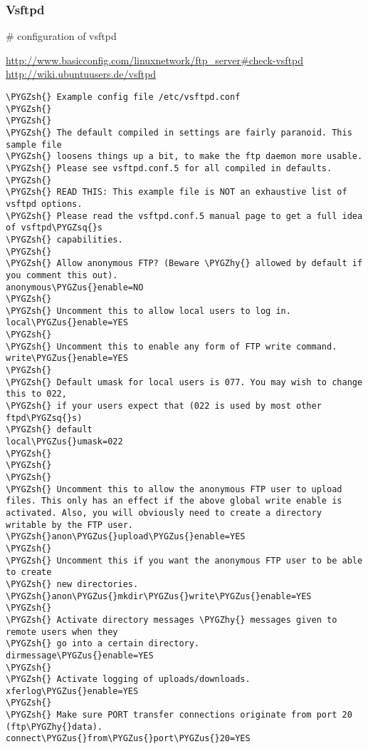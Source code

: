 \documentclass[letterpaper,10pt,english]{sphinxmanual}
\def\PYGZus{\char`\_}
\def\PYGZsh{\char`\#}
\def\PYGZhy{\char`\-}
\def\PYGZsq{\char`\'}
\begin{document}
\subsubsection{Vsftpd}
\label{sdocs/ftpserver/vsftpd/vsftpd:vsftpd}\label{sdocs/ftpserver/vsftpd/vsftpd::doc}
\# configuration of vsftpd

\href{http://www.basicconfig.com/linuxnetwork/ftp\_server\#check-vsftpd}{http://www.basicconfig.com/linuxnetwork/ftp\_server\#check-vsftpd}
\href{http://wiki.ubuntuusers.de/vsftpd}{http://wiki.ubuntuusers.de/vsftpd}

\begin{Verbatim}[commandchars=\\\{\}]
\PYGZsh{} Example config file /etc/vsftpd.conf
\PYGZsh{}
\PYGZsh{}
\PYGZsh{} The default compiled in settings are fairly paranoid. This sample file
\PYGZsh{} loosens things up a bit, to make the ftp daemon more usable.
\PYGZsh{} Please see vsftpd.conf.5 for all compiled in defaults.
\PYGZsh{}
\PYGZsh{} READ THIS: This example file is NOT an exhaustive list of vsftpd options.
\PYGZsh{} Please read the vsftpd.conf.5 manual page to get a full idea of vsftpd\PYGZsq{}s
\PYGZsh{} capabilities.
\PYGZsh{}
\PYGZsh{} Allow anonymous FTP? (Beware \PYGZhy{} allowed by default if you comment this out).
anonymous\PYGZus{}enable=NO
\PYGZsh{}
\PYGZsh{} Uncomment this to allow local users to log in.
local\PYGZus{}enable=YES
\PYGZsh{}
\PYGZsh{} Uncomment this to enable any form of FTP write command.
write\PYGZus{}enable=YES
\PYGZsh{}
\PYGZsh{} Default umask for local users is 077. You may wish to change this to 022,
\PYGZsh{} if your users expect that (022 is used by most other ftpd\PYGZsq{}s)
\PYGZsh{} default
local\PYGZus{}umask=022
\PYGZsh{}
\PYGZsh{}
\PYGZsh{}
\PYGZsh{} Uncomment this to allow the anonymous FTP user to upload files. This only has an effect if the above global write enable is activated. Also, you will obviously need to create a directory writable by the FTP user.
\PYGZsh{}anon\PYGZus{}upload\PYGZus{}enable=YES
\PYGZsh{}
\PYGZsh{} Uncomment this if you want the anonymous FTP user to be able to create
\PYGZsh{} new directories.
\PYGZsh{}anon\PYGZus{}mkdir\PYGZus{}write\PYGZus{}enable=YES
\PYGZsh{}
\PYGZsh{} Activate directory messages \PYGZhy{} messages given to remote users when they
\PYGZsh{} go into a certain directory.
dirmessage\PYGZus{}enable=YES
\PYGZsh{}
\PYGZsh{} Activate logging of uploads/downloads.
xferlog\PYGZus{}enable=YES
\PYGZsh{}
\PYGZsh{} Make sure PORT transfer connections originate from port 20 (ftp\PYGZhy{}data).
connect\PYGZus{}from\PYGZus{}port\PYGZus{}20=YES

\end{Verbatim}
\end{document}

